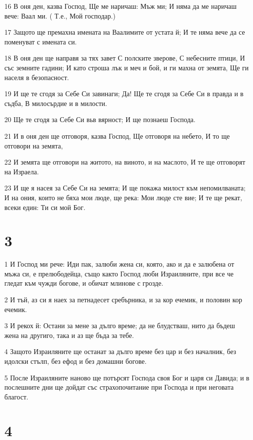 \par 16 В оня ден, казва Господ, Ще ме наричаш: Мъж ми; И няма да ме наричаш вече: Ваал ми. ( Т.е., Мой господар.)
\par 17 Защото ще премахна имената на Ваалимите от устата й; И те няма вече да се поменуват с имената си.
\par 18 В оня ден ще направя за тях завет С полските зверове, С небесните птици, И със земните гадини; И като строша лък и меч и бой, и ги махна от земята, Ще ги населя в безопасност.
\par 19 И ще те сгодя за Себе Си завинаги; Да! Ще те сгодя за Себе Си в правда и в съдба, В милосърдие и в милости.
\par 20 Ще те сгодя за Себе Си вьв вярност; И ще познаеш Господа.
\par 21 И в оня ден ще отговоря, казва Господ, Ще отговоря на небето, И то ще отговори на земята,
\par 22 И земята ще отговори на житото, на виното, и на маслото, И те ще отговорят на Израела.
\par 23 И ще я насея за Себе Си на земята; И ще покажа милост към непомилваната; И на ония, които не бяха мои люде, ще река: Мои люде сте вие; И те ще рекат, всеки един: Ти си мой Бог.

\chapter{3}

\par 1 И Господ ми рече: Иди пак, залюби жена си, която, ако и да е залюбена от мъжа си, е прелюбодейца, също както Господ люби Израиляните, при все че гледат към чужди богове, и обичат млинове с грозде.
\par 2 И тъй, аз си я наех за петнадесет сребърника, и за кор ечемик, и половин кор ечемик.
\par 3 И рекох й: Остани за мене за дълго време; да не блудстваш, нито да бъдеш жена на другиго, така и аз ще бъда за тебе.
\par 4 Защото Израиляните ще останат за дълго време без цар и без началник, без идолски  стълп, без ефод и без домашни богове.
\par 5 После Израиляните наново ще потърсят Господа своя Бог и царя си Давида; и в послешните дни ще дойдат със страхопочитание при Господа и при неговата благост.

\chapter{4}

